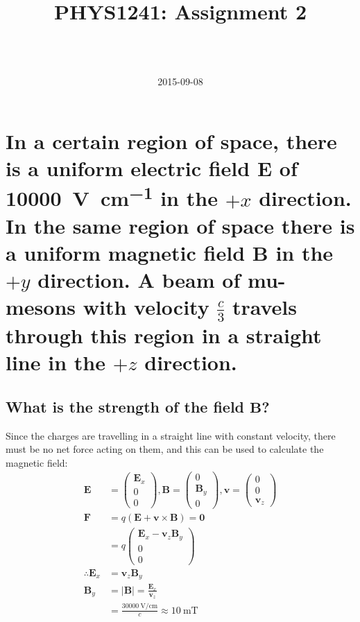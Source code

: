 \documentclass[a4paper]{scrartcl}
\begin{document}
\title{PHYS1241: Assignment 2}
\author{ \\ \\ }
\date{2015-09-08}
\maketitle

\section{In a certain region of space, there is a uniform electric field \(\mathbf{E}\) of \SI{10000}{\volt\per\centi\metre} in the \(+x\) direction. In the same region of space there is a uniform magnetic field \(\mathbf{B}\) in the \(+y\) direction. A beam of mu-mesons with velocity \(\frac{c}{3}\) travels through this region in a straight line in the \(+z\) direction.}
\subsection{What is the strength of the field \(\mathbf{B}\)?}
Since the charges are travelling in a straight line with constant velocity, there must be no net force acting on them, and this can be used to calculate the magnetic field:
\begin{align*}
    \mathbf{E} &= \begin{pmatrix}\mathbf{E}_x \\ 0 \\ 0\end{pmatrix},
    \mathbf{B} = \begin{pmatrix}0 \\ \mathbf{B}_y \\ 0\end{pmatrix},
    \mathbf{v} = \begin{pmatrix}0 \\ 0 \\ \mathbf{v}_z\end{pmatrix} \\
    \mathbf{F} &= q (\mathbf{E} + \mathbf{v} \times \mathbf{B}) = \mathbf{0} \\
    &= q \begin{pmatrix}\mathbf{E}_x - \mathbf{v}_z \mathbf{B}_y \\ 0 \\ 0\end{pmatrix} \\
    \therefore \mathbf{E}_x &= \mathbf{v}_z \mathbf{B}_y \\
    \mathbf{B}_y &= |\mathbf{B}| = \frac{\mathbf{E}_x}{\mathbf{v}_z} \\
    &= \frac{\SI{30000}{\volt\per\centi\metre}}{c} \approx \SI{10}{\milli\tesla}
\end{align*}
\end{document}
